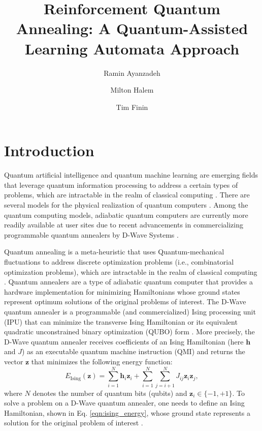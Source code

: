 \documentclass[fleqn,10pt]{wlscirep}
\title{Reinforcement Quantum Annealing: A Quantum-Assisted Learning Automata Approach}
\author[1,*]{Ramin Ayanzadeh}
\author[1]{Milton Halem}
\author[1]{Tim Finin}
\affil[1]{Department of Computer Science and Electrical Engineering, University of Maryland, Baltimore County, Baltimore, MD 21250, United States}
\affil[*]{ayanzadeh@umbc.edu}
\begin{document}
\flushbottom
\maketitle
\thispagestyle{empty}

\section*{Introduction}
Quantum artificial intelligence and quantum machine learning are emerging fields that leverage quantum information processing to address a certain types of problems, which are intractable in the realm of classical computing \cite{lamata2017basic,biamonte2017quantum,dunjko2018machine}. There are several models for the physical realization of quantum computers \cite{ladd2010quantum}. Among the quantum computing models, adiabatic quantum computers are currently more readily available at user sites due to recent advancements in commercializing programmable quantum annealers by D-Wave Systems \cite{johnson2011quantum}. 

Quantum annealing is a meta-heuristic that uses Quantum-mechanical fluctuations to address discrete optimization problems (i.e., combinatorial optimization problems), which are intractable in the realm of classical computing \cite{finnila1994quantum,kadowaki1998quantum,ohzeki2011quantum,nishimori2017exponential}. Quantum annealers are a type of adiabatic quantum computer that provides a hardware implementation for minimizing Hamiltonians whose ground states represent optimum solutions of the original problems of interest. The D-Wave quantum annealer is a programmable (and commercialized) Ising processing unit (IPU) that can minimize the  transverse Ising Hamiltonian or its equivalent quadratic unconstrained binary optimization (QUBO) form \cite{johnson2011quantum}. More precisely, the D-Wave quantum annealer receives coefficients of an Ising Hamiltonian (here $\mathbf{h}$ and $J$) as an executable quantum machine instruction (QMI) and returns the vector $\mathbf{z}$ that minimizes the following energy function: 
\begin{equation}
	\label{eqn:ising_energy}	
	E_{\mathrm{Ising}}{(\mathbf{z})} = \sum_{i=1}^{N}{\mathbf{h}_i\mathbf{z}_i} + \sum_{i=1}^{N}{\sum_{j=i+1}^{N}{J_{ij}\mathbf{z}_i\mathbf{z}_j}},
\end{equation}
where ${N}$ denotes the number of quantum bits (qubits) and $\mathbf{z}_i \in \{-1, +1\}$. To solve a problem on a D-Wave quantum annealer, one needs to define an Ising Hamiltonian, shown in Eq. \eqref{eqn:ising_energy}, whose ground state represents a solution for the original problem of interest \cite{ayanzadeh2019an}. 
\end{document}
